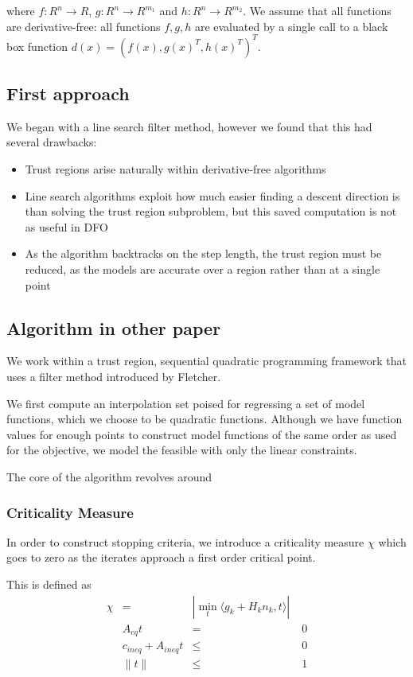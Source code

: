\documentclass{article} %
\begin{document}
where $f : R^n \to R$, $g : R^{n} \to R^{m_1}$ and $h : R^{n} \to R^{m_2}$.
We assume that all functions are derivative-free: all functions $f,g,h$ are evaluated by a single call to a black box function $d(x) = (f(x), g(x)^T, h(x)^T)^T$.



\subsection{First approach}
We began with a line search filter method, however we found that this had several drawbacks:

\begin{itemize}
\item Trust regions arise naturally within derivative-free algorithms
\item Line search algorithms exploit how much easier finding a descent direction is than solving the trust region subproblem, but this saved computation is not as useful in DFO
\item As the algorithm backtracks on the step length, the trust region must be reduced, as the models are accurate over a region rather than at a single point
\end{itemize}

\subsection{Algorithm in other paper}


We work within a trust region, sequential quadratic programming framework that uses a filter method introduced by Fletcher.

We first compute an interpolation set poised for regressing a set of model functions, which we choose to be quadratic functions.
Although we have function values for enough points to construct model functions of the same order as used for the objective, we model the feasible with only the linear constraints.

The core of the algorithm revolves around 


\subsubsection{Criticality Measure}
In order to construct stopping criteria, we introduce a criticality measure $\chi$ which goes to zero as the iterates approach a first order critical point.

This is defined as 
\begin{align*}
\chi & = & |\min_t \langle g_k + H_kn_k, t\rangle| \\
& A_{eq}t &=& \; 0 \\
& c_{ineq} + A_{ineq}t &\le& \; 0 \\
& \| t \| &\le& \; 1
\end{align*}
\end{document}
